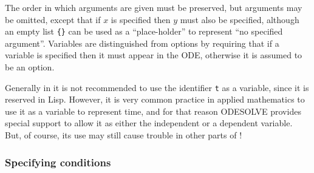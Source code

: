 The order in which arguments are given must be preserved, but
arguments may be omitted, except that if $x$ is specified then $y$
must also be specified, although an empty list \texttt{\{\}} can be used
as a ``place-holder'' to represent ``no specified argument''.
Variables are distinguished from options by requiring that if a
variable is specified then it must appear in the ODE, otherwise it is
assumed to be an option.

Generally in \REDUCE{} it is not recommended to use the identifier
\texttt{t} as a variable, since it is reserved in Lisp.  However, it is
very common practice in applied mathematics to use it as a variable to
represent time, and for that reason ODESOLVE provides special support
to allow it as either the independent or a dependent variable.  But,
of course, its use may still cause trouble in other parts of \REDUCE!


\subsubsection{Specifying conditions}

